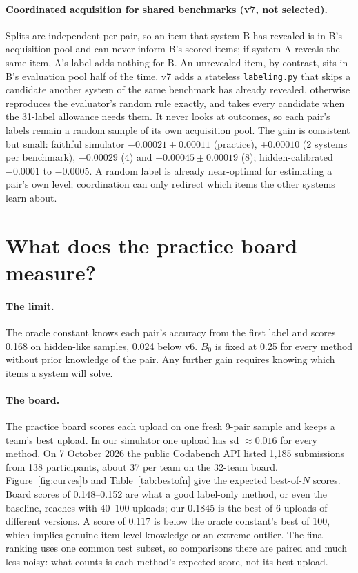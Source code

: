 \documentclass{article}
\begin{document}
\paragraph{Coordinated acquisition for shared benchmarks (v7, not selected).}
\label{sec:v7}
Splits are independent per pair, so an item that system B has revealed is in B's acquisition pool and can never inform B's scored
items; if system A reveals the same item, A's label adds nothing for B. An unrevealed item, by contrast, sits in B's evaluation pool
half of the time. v7 adds a stateless \texttt{labeling.py} that skips a candidate another system of the same benchmark has already
revealed, otherwise reproduces the evaluator's random rule exactly, and takes every candidate when the 31-label allowance needs them.
It never looks at outcomes, so each pair's labels remain a random sample of its own acquisition pool. The gain is consistent but
small: faithful simulator $-0.00021 \pm 0.00011$ (practice), $+0.00010$ (2 systems per benchmark), $-0.00029$ (4) and
$-0.00045 \pm 0.00019$ (8); hidden-calibrated $-0.0001$ to $-0.0005$. A random label is already near-optimal for estimating a pair's
own level; coordination can only redirect which items the other systems learn about.

\section{What does the practice board measure?}
\label{sec:board}

\paragraph{The limit.} The oracle constant knows each pair's accuracy from the first label and scores 0.168 on hidden-like samples,
0.024 below v6. $B_0$ is fixed at 0.25 for every method without prior knowledge of the pair. Any further gain requires knowing which
items a system will solve.

\paragraph{The board.} The practice board scores each upload on one fresh 9-pair sample and keeps a team's best upload. In our
simulator one upload has sd $\approx 0.016$ for every method. On 7 October 2026 the public Codabench API listed 1{,}185 submissions
from 138 participants, about 37 per team on the 32-team board. Figure~\ref{fig:curves}b and Table~\ref{tab:bestofn} give the
expected best-of-$N$ scores. Board scores of 0.148--0.152 are what a good label-only method, or even the baseline, reaches with
40--100 uploads; our 0.1845 is the best of 6 uploads of different versions. A score of 0.117 is below the oracle constant's best of
100, which implies genuine item-level knowledge or an extreme outlier. The final ranking uses one common test subset, so comparisons
there are paired and much less noisy: what counts is each method's expected score, not its best upload.
\end{document}
